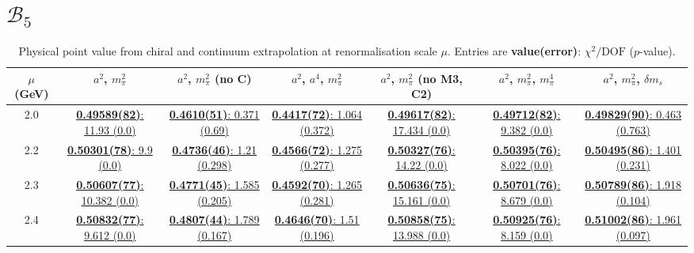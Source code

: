 \documentclass[12pt]{extarticle}
\begin{document}
\section{$\mathcal{B}_5$}
\begin{table}[h!]
\begin{center}
\begin{tabular}{|c|c|c|c|c|c|c|}
\hline
$\mu$ (GeV) & $a^2$, $m_\pi^2$& $a^2$, $m_\pi^2$ (no C)& $a^2$, $a^4$, $m_\pi^2$& $a^2$, $m_\pi^2$ (no M3, C2)& $a^2$, $m_\pi^2$, $m_\pi^4$& $a^2$, $m_\pi^2$, $\delta m_s$\\
\hline
2.0& \hyperlink{TT/SUSY/a2m2_20.pdf.1}{\textbf{0.49589(82)}: 11.93 (0.0)} & \hyperlink{TT/SUSY/a2m2noC_20.pdf.1}{\textbf{0.4610(51)}: 0.371 (0.69)} & \hyperlink{TT/SUSY/a2a4m2_20.pdf.1}{\textbf{0.4417(72)}: 1.064 (0.372)} & \hyperlink{TT/SUSY/a2m2mcut_20.pdf.1}{\textbf{0.49617(82)}: 17.434 (0.0)} & \hyperlink{TT/SUSY/a2m2m4_20.pdf.1}{\textbf{0.49712(82)}: 9.382 (0.0)} & \hyperlink{TT/SUSY/a2m2delm_20.pdf.1}{\textbf{0.49829(90)}: 0.463 (0.763)}\\
2.2& \hyperlink{TT/SUSY/a2m2_22.pdf.1}{\textbf{0.50301(78)}: 9.9 (0.0)} & \hyperlink{TT/SUSY/a2m2noC_22.pdf.1}{\textbf{0.4736(46)}: 1.21 (0.298)} & \hyperlink{TT/SUSY/a2a4m2_22.pdf.1}{\textbf{0.4566(72)}: 1.275 (0.277)} & \hyperlink{TT/SUSY/a2m2mcut_22.pdf.1}{\textbf{0.50327(76)}: 14.22 (0.0)} & \hyperlink{TT/SUSY/a2m2m4_22.pdf.1}{\textbf{0.50395(76)}: 8.022 (0.0)} & \hyperlink{TT/SUSY/a2m2delm_22.pdf.1}{\textbf{0.50495(86)}: 1.401 (0.231)}\\
2.3& \hyperlink{TT/SUSY/a2m2_23.pdf.1}{\textbf{0.50607(77)}: 10.382 (0.0)} & \hyperlink{TT/SUSY/a2m2noC_23.pdf.1}{\textbf{0.4771(45)}: 1.585 (0.205)} & \hyperlink{TT/SUSY/a2a4m2_23.pdf.1}{\textbf{0.4592(70)}: 1.265 (0.281)} & \hyperlink{TT/SUSY/a2m2mcut_23.pdf.1}{\textbf{0.50636(75)}: 15.161 (0.0)} & \hyperlink{TT/SUSY/a2m2m4_23.pdf.1}{\textbf{0.50701(76)}: 8.679 (0.0)} & \hyperlink{TT/SUSY/a2m2delm_23.pdf.1}{\textbf{0.50789(86)}: 1.918 (0.104)}\\
2.4& \hyperlink{TT/SUSY/a2m2_24.pdf.1}{\textbf{0.50832(77)}: 9.612 (0.0)} & \hyperlink{TT/SUSY/a2m2noC_24.pdf.1}{\textbf{0.4807(44)}: 1.789 (0.167)} & \hyperlink{TT/SUSY/a2a4m2_24.pdf.1}{\textbf{0.4646(70)}: 1.51 (0.196)} & \hyperlink{TT/SUSY/a2m2mcut_24.pdf.1}{\textbf{0.50858(75)}: 13.988 (0.0)} & \hyperlink{TT/SUSY/a2m2m4_24.pdf.1}{\textbf{0.50925(76)}: 8.159 (0.0)} & \hyperlink{TT/SUSY/a2m2delm_24.pdf.1}{\textbf{0.51002(86)}: 1.961 (0.097)}\\
\hline
\end{tabular}
\caption{Physical point value from chiral and continuum extrapolation at renormalisation scale $\mu$. Entries are \textbf{value(error)}: $\chi^2/\text{DOF}$ ($p$-value).}
\end{center}
\end{table}
\end{document}
